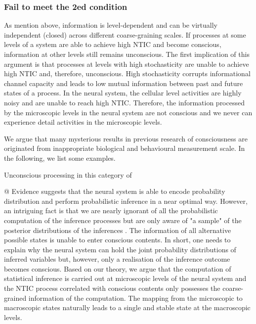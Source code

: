 \documentclass[utf8]{article}
\begin{document}
        \subsubsection*{Fail to meet the 2\lowercase{ed} condition}
        As mention above, information is level-dependent and can be virtually independent (closed) across different coarse-graining scales. If processes at some levels of a system are able to achieve high NTIC and become conscious, information at other levels still remains unconscious. The first implication of this argument is that processes at levels with high stochasticity are unable to achieve high NTIC and, therefore, unconscious. High stochasticity corrupts informational channel capacity and leads to low mutual information between past and future states of a process. In the neural system, the cellular level activities are highly noisy and are unable to reach high NTIC. Therefore, the information processed by the microscopic levels in the neural system are not conscious and we never can experience detail activities in the microscopic levels. 
        
        
        We argue that many mysterious results in previous research of consciousness are originated from inappropriate biological and behavioural measurement scale. In the following, we list some examples. 
        
        
        Unconscious processing in this category of 
        
        @ Evidence suggests that the neural system is able to encode probability distribution and perform probabilistic inference in a near optimal way. However, an intriguing fact is that we are nearly ignorant of all the probabilistic computation of the inference processes but are only aware of "a sample" of the posterior distributions of the inferences \citep{dehaene2017consciousness, vul2009attention, asplund2014attentional, vul2008temporal, moreno2011bayesian}. The information of all alternative possible states is unable to enter conscious contents. In short, one needs to explain why the neural system can hold the joint probability distributions of inferred variables but, however, only a realisation of the inference outcome becomes conscious. Based on our theory, we argue that the computation of statistical inference is carried out at microscopic levels of the neural system and the NTIC process correlated with conscious contents only possesses the coarse-grained information of the computation. The mapping from the microscopic to macroscopic states naturally leads to a single and stable state at the macroscopic levels.
        
\end{document}
